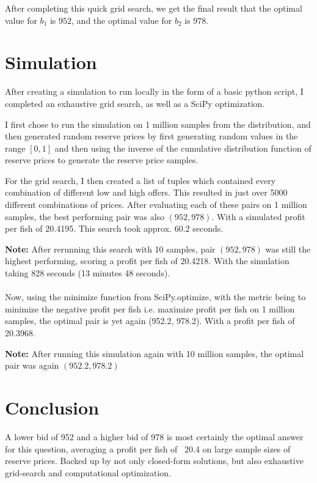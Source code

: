 \documentclass{article}
\begin{document}
After completing this quick grid search, we get the final result that the optimal value for
$b_1$ is $952$, and the optimal value for $b_2$ is $978$.

\section*{Simulation}
After creating a simulation to run locally in the form of a basic python script, I 
completed an exhaustive grid search, as well as a SciPy optimization. 

I first chose to run the simulation on 1 million samples from the distribution, and then 
generated random reserve prices by first generating random values in the range $[0, 1]$ and 
then using the inverse of the cumulative distribution function of reserve prices to 
generate the reserve price samples. 

For the grid search, I then created a list of tuples which contained every combination 
of different low and high offers. This resulted in just over 5000 different combinations 
of prices. After evaluating each of these pairs on 1 million samples, the best performing 
pair was also $(952, 978)$. With a simulated profit per fish of 20.4195. This search took 
approx. 60.2 seconds.

\textbf{Note:} After rerunning this search with 10 samples, pair $(952, 978)$ was still the 
highest performing, scoring a profit per fish of 20.4218. With the simulation taking 828 seconds 
(13 minutes 48 seconds).
\\
\\
\indent Now, using the minimize function from SciPy.optimize, with the metric being to minimize 
the negative profit per fish i.e. maximize profit per fish on 1 million samples, the optimal pair 
is yet again (952.2, 978.2). With a profit per fish of 20.3968.

\textbf{Note:} After running this simulation again with 10 million samples, the optimal pair was again 
$(952.2 ,978.2)$

\section*{Conclusion}
A lower bid of 952 and a higher bid of 978 is most certainly the optimal answer for this question, 
averaging a profit per fish of ~20.4 on large sample sizes of reserve prices. Backed up by not only 
closed-form solutions, but also exhaustive grid-search and computational optimization.
\end{document}
